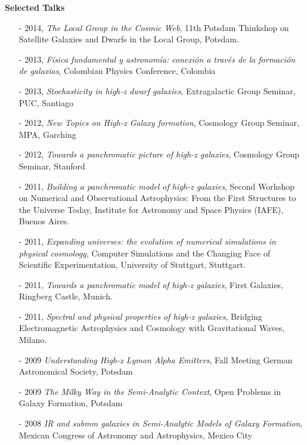 \documentclass[letterpaper,11pt,onecolumn]{article}
\begin{document}
{\bf Selected Talks}
\begin{itemize} 
\item [-] 2014, {\it The Local Group in the Cosmic Web}, 11th Potsdam
  Thinkshop on Satellite Galaxies and Dwarfs in the Local Group,
  Potsdam.
\item [-] 2013, {\it F\'isica fundamental y astronom\'ia: conexi\'on a trav\'es de la formaci\'on de galaxias}, Colombian Physics Conference, Colombia
\item [-] 2013, {\it Stochasticity in high-z dwarf galaxies},
  Extragalactic Group Seminar, PUC, Santiago
\item [-] 2012, {\it New Topics on High-z Galaxy formation}, Cosmology
  Group Seminar, MPA, Garching 
\item [-] 2012, {\it Towards a panchromatic picture of high-z
  galaxies}, Cosmology Group Seminar, Stanford 
\item [-] 2011, {\it Building a panchromatic model of high-z
  galaxies}, Second Workshop on Numerical and Observational
  Astrophysics: From the First Structures to the Universe Today,
  Institute for Astronomy and Space Physics (IAFE), Buenos Aires. 
\item [-] 2011, {\it Expanding universes: the evolution of numerical
  simulations in physical cosmology}, Computer Simulations and the
  Changing Face of Scientific Experimentation, University of
  Stuttgart, Stuttgart. 
\item [-] 2011, {\it Towards a panchromatic model of high-z galaxies}, First
  Galaxies, Ringberg Castle, Munich.  
\item [-] 2011, {\it Spectral and physical properties of high-z galaxies},
  Bridging Electromagnetic Astrophysics and Cosmology with Gravitational
  Waves, Milano.
\item [-] 2009 {\it Understanding High-z Lyman Alpha Emitters}, Fall
  Meeting German Astronomical Society, Potsdam 
\item [-] 2009 {\it The Milky Way in the Semi-Analytic Context}, Open
  Problems in Galaxy Formation, Potsdam 
\item [-] 2008 {\it IR and submm galaxies in Semi-Analytic Models of
  Galaxy Formation}, Mexican Congress of Astronomy and Astrophysics,
  Mexico City 

\end{itemize}
\end{document}
